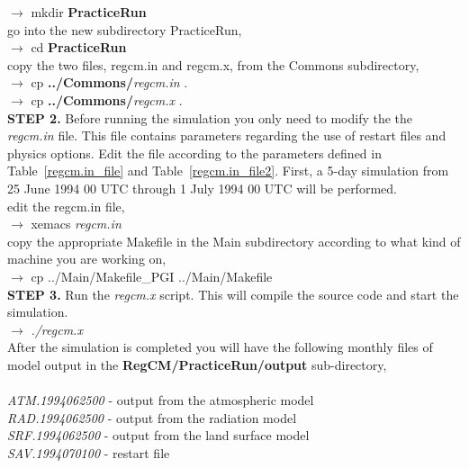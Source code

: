 \indent 
$\rightarrow$ mkdir {\bf PracticeRun} \\ 

\noindent
go into the new subdirectory PracticeRun, \\

\indent 
$\rightarrow$ cd  {\bf PracticeRun}  \\ 

\noindent
copy the two files, regcm.in and regcm.x, from the Commons subdirectory, \\

\indent 
$\rightarrow$ cp  {\bf ../Commons/}{\it regcm.in} .  \\ 
\indent
$\rightarrow$ cp  {\bf ../Commons/}{\it regcm.x}  .  \\ 


\indent
{\bf STEP 2.} Before running the simulation you only need to modify the 
the {\it regcm.in} file.  This file contains parameters regarding the 
use of restart files and physics options.  Edit the file according to the parameters 
defined in Table~\ref{regcm.in_file} and Table~\ref{regcm.in_file2}.  First, a 5-day 
simulation from 25 June 1994 00 UTC through 1 July 1994 00 UTC will be performed.  \\

\noindent
edit the regcm.in file, \\

\indent 
$\rightarrow$   xemacs {\it regcm.in} \\ 

\noindent
copy the appropriate Makefile  in the Main subdirectory according to what kind of machine you are working on, \\

\indent 
$\rightarrow$   {cp ../Main/Makefile\_PGI ../Main/Makefile} \\

\noindent
{\bf STEP 3.} Run the {\it regcm.x} script.  This will compile the source code and start 
the simulation. \\

\indent 
$\rightarrow$   {\it ./regcm.x } \\


\noindent
After the simulation is completed you will have the following monthly files of model output in the 
{\bf RegCM/PracticeRun/output} sub-directory, \\
\\

{\it ATM.1994062500} - output from the atmospheric model \\
\indent
{\it RAD.1994062500} - output from the radiation model  \\
\indent
{\it SRF.1994062500} - output from the land surface model \\
\indent
{\it SAV.1994070100} - restart file \\

